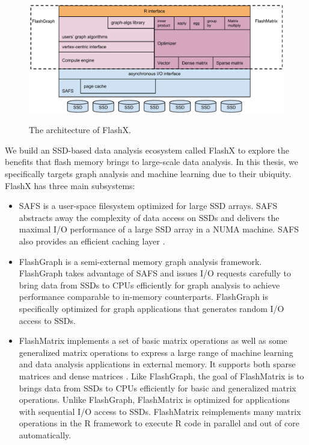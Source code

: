 \makeatletter
\let\@currsize\normalsize
\makeatother

\begin{figure}[t]
\centering
\includegraphics[scale=0.5]{figs/arch.pdf}
\label{fig:arch}
\caption{The architecture of FlashX.}
\end{figure}

We build an SSD-based data analysis ecosystem called FlashX to explore the benefits
that flash memory brings to large-scale data analysis. In this thesis,
we specifically targets graph analysis and machine learning due to their ubiquity.
FlashX has three main subsystems:
\begin{itemize}
	\item SAFS \cite{safs} is a user-space filesystem optimized for large SSD
		arrays. SAFS abstracts away the complexity of data access on SSDs and
		delivers the maximal I/O performance of a large SSD array in a NUMA
		machine. SAFS also provides an efficient caching layer \cite{SA-cache}.
	\item FlashGraph \cite{flashgraph} is a semi-external memory graph analysis
		framework. FlashGraph takes advantage of SAFS and issues I/O requests
		carefully to bring data from SSDs to CPUs efficiently for graph analysis
		to achieve performance comparable to in-memory counterparts. FlashGraph
		is specifically optimized for graph applications that generates random
		I/O access to SSDs.
	\item FlashMatrix implements a set of basic matrix operations as well as
		some generalized matrix operations to express a large range of machine
		learning and data analysis applications in external memory. It supports
		both sparse matrices \cite{SEM_SpMM} and dense matrices \cite{flashmatrix}.
		Like FlashGraph, the goal of FlashMatrix is to brings data from SSDs to
		CPUs efficiently for basic and generalized matrix operations. Unlike
		FlashGraph, FlashMatrix is optimized for applications with sequential
		I/O access to SSDs. FlashMatrix reimplements many matrix operations
		in the R framework to execute R code in parallel and out of core
		automatically.
\end{itemize}

